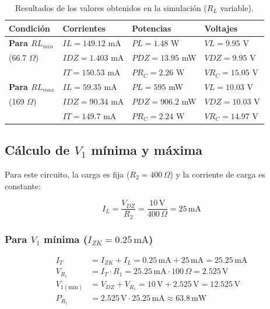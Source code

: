 \documentclass[journal]{IEEEtran}
\begin{document}
\begin{table}[H]
\centering
\begin{tabularx}{\columnwidth}{|X|X|X|X|}
\hline
\textbf{Condición} & \textbf{Corrientes} & \textbf{Potencias} & \textbf{Voltajes}\\ \hline
\textbf{Para $RL_{min}$} & $IL=149.12$ mA & $PL=1.48$ W & $VL=9.95$ V \\ 
(66.7 $\Omega$) & $IDZ=1.403$ mA & $PDZ=13.95$ mW & $VDZ=9.95$ V \\ 
& $IT=150.53$ mA & $PR_{C}=2.26$ W & $VR_{C}=15.05$ V \\ \hline
\textbf{Para $RL_{max}$} & $IL=59.35$ mA & $PL=595$ mW & $VL=10.03$ V \\ 
(169 $\Omega$) & $IDZ=90.34$ mA & $PDZ=906.2$ mW & $VDZ=10.03$ V \\ 
& $IT=149.7$ mA & $PR_{C}=2.24$ W & $VR_{C}=14.97$ V \\ \hline
\end{tabularx}
\caption{Resultados de los valores obtenidos en la simulación ($R_L$ variable).}
\label{tablaSimulacionRL}
\end{table}


\subsection{Cálculo de $V_1$ mínima y máxima}

Para este circuito, la carga es fija ($R_2 = 400\,\Omega$) y la corriente de carga es constante:

\begin{equation*}
I_L = \frac{V_{DZ}}{R_2} = \frac{10\,\text{V}}{400\,\Omega} = 25\,\text{mA}
\end{equation*}

\subsubsection{Para $V_1$ mínima ($I_{ZK} = 0.25\,\text{mA}$)}

\begin{align*}
I_T &= I_{ZK} + I_L = 0.25\,\text{mA} + 25\,\text{mA} = 25.25\,\text{mA} \\
V_{R_1} &= I_T \cdot R_1 = 25.25\,\text{mA} \cdot 100\,\Omega = 2.525\,\text{V} \\
V_{1(\text{min})} &= V_{DZ} + V_{R_1} 
= 10\,\text{V} + 2.525\,\text{V} = 12.525\,\text{V} \\
P_{R_1} &= 2.525\,\text{V} \cdot 25.25\,\text{mA} 
\approx 63.8\,\text{mW}
\end{align*}
\end{document}
